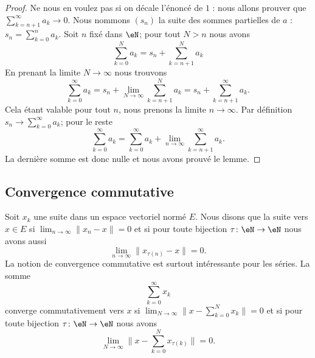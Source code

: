\begin{proof}
	Ne nous en voulez pas si on décale l'énoncé de \( 1\) : nous allons prouver que \( \sum_{k=n+1}^{\infty}a_k\to 0\). Nous nommons \( (s_n)\) la suite des sommes partielles de \( a\) : \( s_n=\sum_{k=0}^na_k\). Soit \( n\) fixé dans \( \eN\); pour tout \( N>n\) nous avons
	\begin{equation}
		\sum_{k=0}^Na_k=s_n+\sum_{k=n+1}^Na_k
	\end{equation}
	En prenant la limite \( N\to \infty\) nous trouvons
	\begin{equation}
		\sum_{k=0}^{\infty}a_k=s_n+\lim_{N\to \infty} \sum_{k=n+1}^Na_k=s_n+\sum_{k=n+1}^{\infty}a_k.
	\end{equation}
	Cela étant valable pour tout \( n\), nous prenons la limite \( n\to\infty\). Par définition \( s_n\to\sum_{k=0}^{\infty}a_k\); pour le reste
	\begin{equation}
		\sum_{k=0}^{\infty}a_k=\sum_{k=0}^{\infty}a_k+\lim_{n\to \infty} \sum_{k=n+1}^{\infty}a_k.
	\end{equation}
	La dernière somme est donc nulle et nous avons prouvé le lemme.
\end{proof}


\subsection{Convergence commutative}

\begin{definition}      \label{DEFooORAGooZslkyS}
	Soit \( x_k\) une suite dans un espace vectoriel normé \( E\). Nous disons que la suite  vers \( x\in E\) si \( \lim_{n\to \infty}\| x_n-x \| =0\) et si pour toute bijection \( \tau\colon \eN\to \eN\) nous avons aussi
	\begin{equation}
		\lim_{n\to \infty} \| x_{\tau(n)}-x \|=0.
	\end{equation}
	La notion de convergence commutative est surtout intéressante pour les séries. La somme
	\begin{equation}
		\sum_{k=0}^{\infty}x_k
	\end{equation}
	converge commutativement vers \( x\) si \( \lim_{N\to \infty} \| x-\sum_{k=0}^Nx_k \|=0\) et si pour toute bijection \( \tau\colon \eN\to \eN\) nous avons
	\begin{equation}
		\lim_{N\to \infty} \| x-\sum_{k=0}^Nx_{\tau(k)} \|=0.
	\end{equation}
\end{definition}

